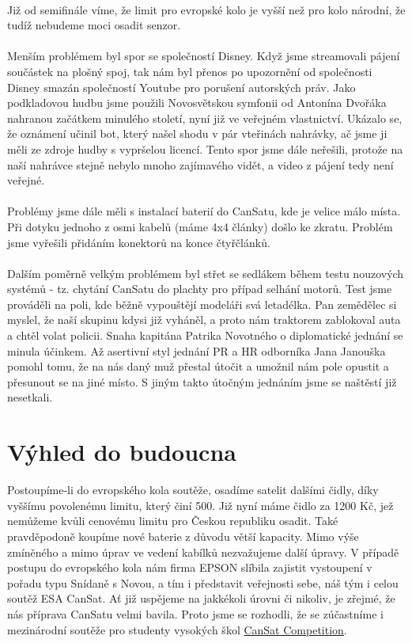 \documentclass[a4paper]{report}
\begin{document}
\paragraph{} Již od semifinále víme, že limit pro evropské kolo je vyšší než pro kolo národní, že tudíž nebudeme moci osadit  senzor.
\paragraph{} Menším problémem byl spor se společností Disney. Když jsme streamovali pájení součástek na plošný spoj, tak nám byl přenos po upozornění od společnosti Disney smazán společností Youtube pro porušení autorských práv. Jako podkladovou hudbu jsme použili Novosvětskou symfonii od Antonína Dvořáka nahranou začátkem minulého století, nyní již ve veřejném vlastnictví. Ukázalo se, že oznámení učinil bot, který našel shodu v pár vteřinách nahrávky, ač jsme ji měli ze zdroje hudby s vypršelou licencí. Tento spor jsme dále neřešili, protože na naší nahrávce stejně nebylo mnoho zajímavého vidět, a video z pájení tedy není veřejné.
\paragraph{} Problémy jsme dále měli s instalací baterií do CanSatu, kde je velice málo místa. Při dotyku jednoho z osmi kabelů (máme 4x4 články) došlo ke zkratu. Problém jsme vyřešili přidáním konektorů na konce čtyřčlánků.
\paragraph{} Dalším poměrně velkým problémem byl střet se sedlákem během testu nouzových systémů - tz. chytání CanSatu do plachty pro případ selhání motorů. Test jsme prováděli na poli, kde běžně vypouštějí modeláři svá letadélka. Pan zemědělec si myslel, že naší skupinu kdysi již vyháněl, a proto nám traktorem zablokoval auta a chtěl volat policii. Snaha kapitána Patrika Novotného o diplomatické jednání se minula účinkem. Až asertivní styl jednání PR a HR odborníka Jana Janouška pomohl tomu, že na nás daný muž přestal útočit a umožnil nám pole opustit a přesunout se na jiné místo. S jiným takto útočným jednáním jsme se naštěstí již nesetkali.
\section{Výhled do budoucna}
Postoupíme-li do evropského kola soutěže, osadíme satelit dalšími čidly, díky vyššímu povolenému limitu, který činí 500\EUR. Již nyní máme čidlo  za 1200 Kč, jež nemůžeme kvůli cenovému limitu pro Českou republiku osadit. Také pravděpodoně koupíme nové baterie z důvodu větší kapacity. Mimo výše zmíněného a mimo úprav ve vedení kabílků nezvažujeme další úpravy. V případě postupu do evropského kola nám firma EPSON slíbila zajistit vystoupení v pořadu typu Snídaně s Novou, a tím i představit veřejnosti sebe, náš tým i celou soutěž ESA CanSat. Ať již uspějeme na jakkékoli úrovni či nikoliv, je zřejmé, že nás příprava CanSatu velmi bavila. Proto jsme se rozhodli, že se zúčastníme i mezinárodní soutěže pro studenty vysokých škol \href{http://www.cansatcompetition.com/}{CanSat Competition}.
\end{document}
